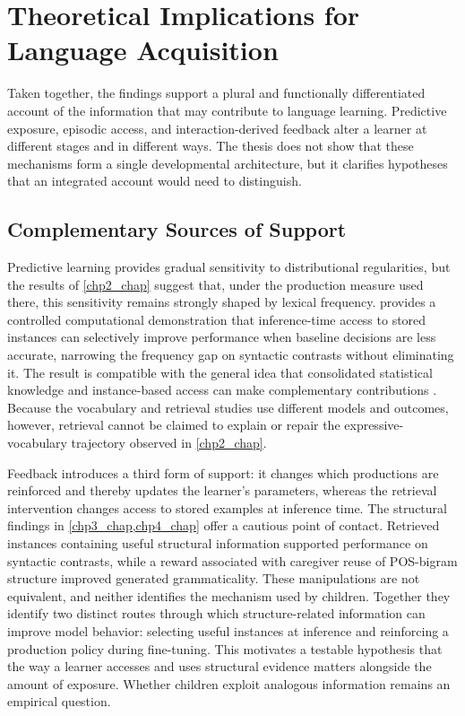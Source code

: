 \section{Theoretical Implications for Language Acquisition}
\label{sec:gd_theory}

Taken together, the findings support a plural and functionally differentiated account of the information that may contribute to language learning. Predictive exposure, episodic access, and interaction-derived feedback alter a learner at different stages and in different ways. The thesis does not show that these mechanisms form a single developmental architecture, but it clarifies hypotheses that an integrated account would need to distinguish.

\subsection{Complementary Sources of Support}

Predictive learning provides gradual sensitivity to distributional regularities, but the results of \cref{chp2_chap} suggest that, under the production measure used there, this sensitivity remains strongly shaped by lexical frequency.  provides a controlled computational demonstration that inference-time access to stored instances can selectively improve performance when baseline decisions are less accurate, narrowing the frequency gap on syntactic contrasts without eliminating it. The result is compatible with the general idea that consolidated statistical knowledge and instance-based access can make complementary contributions \citep{mcclelland1995there,kumaran2016learning}. Because the vocabulary and retrieval studies use different models and outcomes, however, retrieval cannot be claimed to explain or repair the expressive-vocabulary trajectory observed in \cref{chp2_chap}.

Feedback introduces a third form of support: it changes which productions are reinforced and thereby updates the learner's parameters, whereas the retrieval intervention changes access to stored examples at inference time. The structural findings in \cref{chp3_chap,chp4_chap} offer a cautious point of contact. Retrieved instances containing useful structural information supported performance on syntactic contrasts, while a reward associated with caregiver reuse of POS-bigram structure improved generated grammaticality. These manipulations are not equivalent, and neither identifies the mechanism used by children. Together they identify two distinct routes through which structure-related information can improve model behavior: selecting useful instances at inference and reinforcing a production policy during fine-tuning. This motivates a testable hypothesis that the way a learner accesses and uses structural evidence matters alongside the amount of exposure. Whether children exploit analogous information remains an empirical question.

